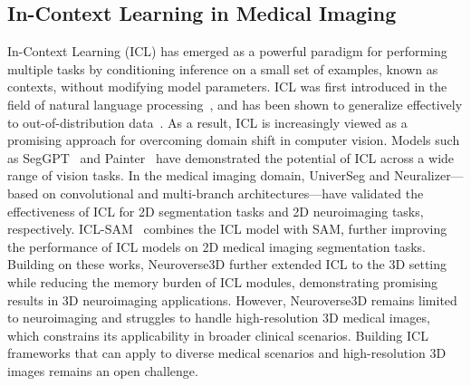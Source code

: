 \subsection{In-Context Learning in Medical Imaging}

In-Context Learning (ICL) has emerged as a powerful paradigm for performing multiple tasks by conditioning inference on a small set of examples, known as contexts, without modifying model parameters. ICL was first introduced in the field of natural language processing~\cite{brown2020language}, and has been shown to generalize effectively to out-of-distribution data~\cite{reddy2023mechanistic, chan2022data}. As a result, ICL is increasingly viewed as a promising approach for overcoming domain shift in computer vision. Models such as SegGPT~\cite{wang2023seggpt} and Painter~\cite{wang2023images} have demonstrated the potential of ICL across a wide range of vision tasks. In the medical imaging domain, UniverSeg and Neuralizer—based on convolutional and multi-branch architectures—have validated the effectiveness of ICL for 2D segmentation tasks and 2D neuroimaging tasks, respectively. ICL-SAM~\cite{hu2024icl} combines the ICL model with SAM, further improving the performance of ICL models on 2D medical imaging segmentation tasks. Building on these works, Neuroverse3D further extended ICL to the 3D setting while reducing the memory burden of ICL modules, demonstrating promising results in 3D neuroimaging applications. However, Neuroverse3D remains limited to neuroimaging and struggles to handle high-resolution 3D medical images, which constrains its applicability in broader clinical scenarios. Building ICL frameworks that can apply to diverse medical scenarios and high-resolution 3D images remains an open challenge.



